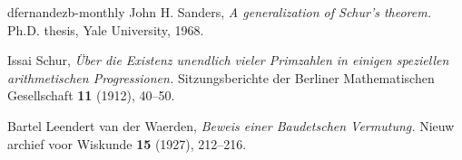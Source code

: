 \documentclass[10pt]{amsart}
\theoremstyle{definition}
\begin{document}
\begin{thebibliography}{dfernandezb-monthly}
John H. Sanders,
{\em A generalization of Schur's theorem.}
Ph.D. thesis, Yale University, 1968.

Issai Schur,
{\em \"Uber die Existenz unendlich vieler Primzahlen in einigen speziellen arithmetischen Progressionen.}
Sitzungsberichte der Berliner Mathematischen Gesellschaft
{\bf 11} (1912), 40--50.


Bartel Leendert van der Waerden,
{\em Beweis einer Baudetschen Vermutung.}
Nieuw archief voor Wiskunde
{\bf 15} (1927), 212--216.

\end{thebibliography}
\end{document}
